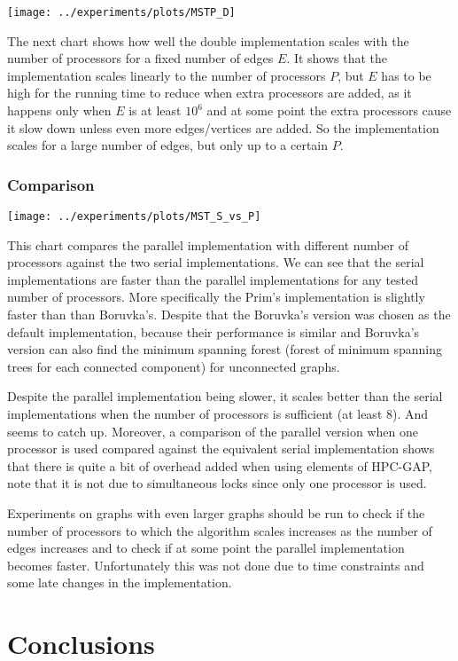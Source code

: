 \documentclass{report}
\theoremstyle{plain}
\theoremstyle{definition}
\theoremstyle{remark}
\begin{document}
\texttt{[image: ../experiments/plots/MSTP\_D]}

The next chart shows how well the double implementation scales with the number of processors for a fixed number of edges $E$. It shows that the implementation scales linearly to the number of processors $P$, but $E$ has to be high for the running time to reduce when extra processors are added, as it happens only when $E$ is at least $10^6$ and at some point the extra processors cause it slow down unless even more edges/vertices are added. So the implementation scales for a large number of edges, but only up to a certain $P$.

\subsection{Comparison}

\texttt{[image: ../experiments/plots/MST\_S\_vs\_P]}

This chart compares the parallel implementation with different number of processors against the two serial implementations. We can see that the serial implementations are faster than the parallel implementations for any tested number of processors. More specifically the Prim's implementation is slightly faster than than Boruvka's. Despite that the Boruvka's version was chosen as the default implementation, because their performance is similar and Boruvka's version can also find the minimum spanning forest (forest of minimum spanning trees for each connected component) for unconnected graphs.

Despite the parallel implementation being slower, it scales better than the serial implementations when the number of processors is sufficient (at least 8). And seems to catch up. Moreover, a comparison of the parallel version when one processor is used compared against the equivalent serial implementation shows that there is quite a bit of overhead added when using elements of HPC-GAP, note that it is not due to simultaneous locks since only one processor is used.

Experiments on graphs with even larger graphs should be run to check if the number of processors to which the algorithm scales increases as the number of edges increases and to check if at some point the parallel implementation becomes faster. Unfortunately this was not done due to time constraints and some late changes in the implementation.

\chapter{Conclusions}
\end{document}

